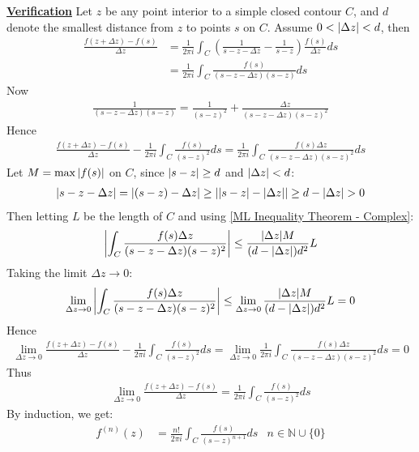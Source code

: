 \documentclass[12pt, english]{book}
\makeatletter
\renewenvironment{proof}[1][\proofname]{\par
	\pushQED{\qed}%
	\normalfont \topsep6\p@\@plus6\p@\relax
	\list{}{%
		\settowidth{\leftmargin}{\itshape\proofname:\hskip\labelsep}%
		\setlength{\labelwidth}{0pt}%
		\setlength{\itemindent}{-\leftmargin}%
	}%
	\item[\hskip\labelsep\itshape#1\@addpunct{:}]\ignorespaces
}{%
	\popQED\endlist\@endpefalse
}
\makeatother
\begin{document}
\begin{proof}
		\underline{\textbf{Verification}} \newline
		Let \(z\) be any point interior to a simple closed contour \(C\), and \(d\) denote the smallest distance from \(z\) to points \(s\) on \(C\). Assume \(0 < \abs{\Delta z} < d\), then 
		\begin{align*}
			\frac{f(z + \Delta z) - f(s)}{\Delta z} 
			&= \frac{1}{2 \pi i} \int_{C} \left(\frac{1}{s - z - \Delta z} - \frac{1}{s - z}\right) \frac{f(s)}{\Delta z} ds \\
			&= \frac{1}{2\pi i} \int_{C} \frac{f(s)}{(s - z - \Delta z)(s-z)} ds
		\end{align*}
		Now
		\begin{align*}
			\frac{1}{(s-z-\Delta z)(s-z)} = \frac{1}{(s-z)^2} + \frac{\Delta z}{(s-z-\Delta z)(s-z)^2}
		\end{align*}
		Hence
		\begin{align*}
			\frac{f(z + \Delta z) - f(s)}{\Delta z} - \frac{1}{2\pi i} \int_{C} \frac{f(s)}{(s-z)^2} ds = \frac{1}{2\pi i} \int_{C} \frac{f(s)\Delta z}{(s-z-\Delta z)(s-z)^2} ds
		\end{align*}
		Let \(M = \max{\abs{f(s)}}\) on \(C\), since \(\abs{s-z} \geq d\) and \(\abs{\Delta z}<d\):
		\begin{align*}
			\abs{s-z-\Delta z} = \abs{(s-z) - \Delta z} \geq \abs{\abs{s-z} - \abs{\Delta z}} \geq d - \abs{\Delta z} > 0
		\end{align*}
		Then letting \(L\) be the length of \(C\) and using \cref{ML Inequality Theorem - Complex}:
		\begin{align*}
			\abs{\int_{C} \frac{f(s) \Delta z}{(s-z-\Delta z)(s-z)^2}} 
			\leq \frac{\abs{\Delta z} M}{(d - \abs{\Delta z}) d^2} L
		\end{align*}
		Taking the limit \(\Delta z \rightarrow 0\):
		\begin{align*}
			\lim_{\Delta z \rightarrow 0} \abs{\int_{C} \frac{f(s) \Delta z}{(s-z-\Delta z)(s-z)^2}} 
			\leq  \lim_{\Delta z \rightarrow 0} \frac{\abs{\Delta z} M}{(d - \abs{\Delta z}) d^2} L = 0
		\end{align*}
		Hence
		\begin{align*}
			\lim_{\Delta z \rightarrow 0} \frac{f(z + \Delta z) - f(s)}{\Delta z} - \frac{1}{2\pi i} \int_{C} \frac{f(s)}{(s-z)^2} ds 
			= \lim_{\Delta z \rightarrow 0} \frac{1}{2\pi i} \int_{C} \frac{f(s)\Delta z}{(s-z-\Delta z)(s-z)^2} ds = 0
		\end{align*}
		Thus 
		\begin{align*}
			\lim_{\Delta z \rightarrow 0} \frac{f(z + \Delta z) 
			- f(s)}{\Delta z} = \frac{1}{2\pi i} \int_{C} \frac{f(s)}{(s-z)^2} ds 
		\end{align*}
		By induction, we get: 
		\begin{align*}
			f^{(n)}(z) &= \frac{n!}{2 \pi i} \int_{C} \frac{f(s)}{(s-z)^{n+1}} ds 
				& n \in \mathbb{N} \cup \{0\}
		\end{align*}
	\end{proof}
	
\end{document}

